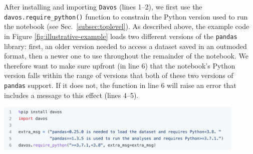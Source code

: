 \documentclass[preprint,12pt,a4paper]{elsarticle}
\begin{document}
After installing and importing \texttt{Davos} (lines 1--2), we first use the \texttt{davos.require\_\-python()} function to constrain the Python version used to run the notebook (see Sec.~\ref{subsec:toplevel}).
As described above, the example code in Figure \ref{fig:illustrative-example} loads two different versions of the \texttt{pandas} library: first, an older version needed to access a dataset saved in an outmoded format, then a newer one to use throughout the remainder of the notebook.
We therefore want to make sure upfront (in line 6) that the notebook's Python version falls within the range of versions that both of these two versions of \texttt{pandas} support.
If it does not, the function in line 6 will raise an error that includes a message to this effect (lines 4--5).
\begin{center}
\includegraphics[width=0.9\textwidth]{figs/example1}
\end{center}
\end{document}
